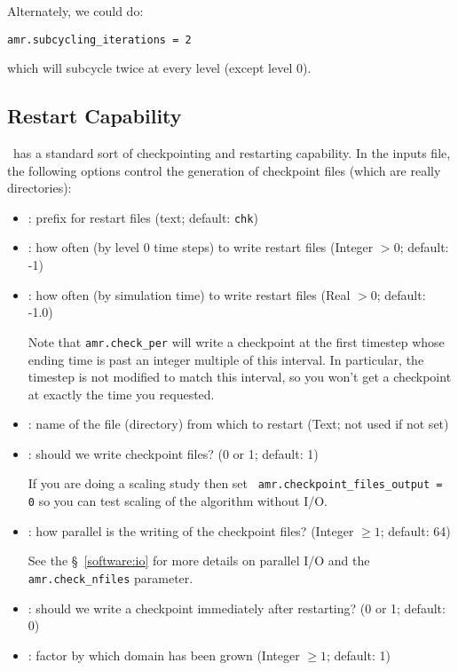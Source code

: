 Alternately, we could do:
\begin{lstlisting}
amr.subcycling_iterations = 2
\end{lstlisting}
which will subcycle twice at every level (except level 0).


\subsection{Restart Capability}

\castro\ has a standard sort of checkpointing and restarting capability. 
In the inputs file, the following options control the generation of
checkpoint files (which are really directories):
\begin{itemize}
\item {}: prefix for restart files (text;
  default: {\tt chk})

\item {}: how often (by level 0 time steps) to
  write restart files (Integer $> 0$; default: -1)

\item {}: how often (by simulation time) to
  write restart files (Real $> 0$; default: -1.0)

  Note that {\tt amr.check\_per} will write a checkpoint at the first
  timestep whose ending time is past an integer multiple of this interval.
  In particular, the timestep is not modified to match this interval, so
  you won't get a checkpoint at exactly the time you requested.

\item {}: name of the file (directory) from
  which to restart (Text; not used if not set)

\item {}: should we write
  checkpoint files? (0 or 1; default: 1)

  If you are doing a scaling study then set {\tt
    amr.checkpoint\_files\_output = 0} so you can test scaling of the
  algorithm without I/O.

\item {}: how parallel is the writing of
  the checkpoint files?  (Integer $\geq 1$; default: 64)

  See the \S~\ref{software:io} for more details on parallel I/O and the 
  {\tt amr.check\_nfiles} parameter.

\item {}: should we write a
  checkpoint immediately after restarting?  (0 or 1; default: 0)

\item {}: factor by which domain has been
  grown (Integer $\geq 1$; default: 1)
\end{itemize}


